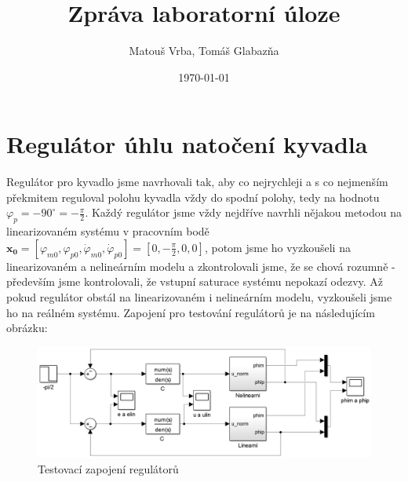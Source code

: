 \documentclass[a4paper,12pt]{article}
\title{Zpráva laboratorní úloze}
\author{Matouš Vrba, Tomáš Glabazňa}
\date{\today}
\begin{document}
\maketitle
\pagebreak

\section{Regulátor úhlu natočení kyvadla}
Regulátor pro kyvadlo jsme navrhovali tak, aby co nejrychleji a s co nejmenším překmitem reguloval polohu kyvadla vždy do spodní polohy, tedy na hodnotu $\varphi_p=-90^{\circ}=-\frac{\pi}{2}$. Každý regulátor jsme vždy nejdříve navrhli nějakou metodou na linearizovaném systému v pracovním bodě $\mathbf{x_0} = \left[\varphi_{m0}, \varphi_{p0}, \dot{\varphi}_{m0}, \dot{\varphi}_{p0}\right] = \left[0, -\frac{\pi}{2}, 0, 0\right]$, potom jsme ho vyzkoušeli na linearizovaném a nelineárním modelu a zkontrolovali jsme, že se chová rozumně - především jsme kontrolovali, že vstupní saturace systému nepokazí odezvy. Až pokud regulátor obstál na linearizovaném i nelineárním modelu, vyzkoušeli jsme ho na reálném systému. Zapojení pro testování regulátorů je na následujícím obrázku:
\begin{figure}[H]
	\centering
    \includegraphics[scale=0.25]{schema_rizeni_nanecisto}
    \caption{Testovací zapojení regulátorů}
\end{figure}
\end{document}
